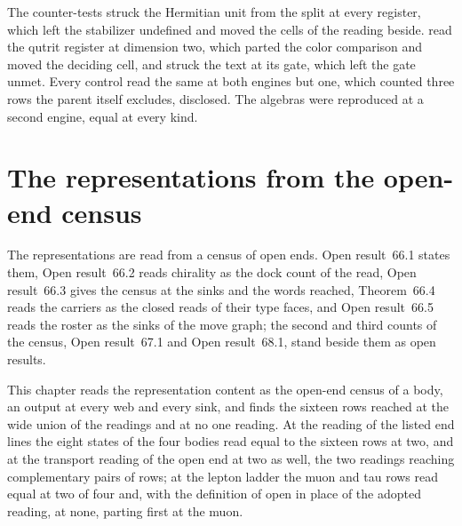 \begin{chproof}
The counter-tests struck the Hermitian unit from the split at every register, which left the stabilizer undefined and moved the cells of the reading beside. read the qutrit register at dimension two, which parted the color comparison and moved the deciding cell, and struck the text at its gate, which left the gate unmet. Every control read the same at both engines but one, which counted three rows the parent itself excludes, disclosed. The algebras were reproduced at a second engine, equal at every kind.
\end{chproof}
\par\medskip{}\label{narr:close:4-2}\par
\section{The representations from the open-end census}\label{mod:IV-3-representations-from-the-open-end-census}
\label{narr:open:4-3}The representations are read from a census of open ends. Open result~66.1 states them, Open result~66.2 reads chirality as the dock count of the read, Open result~66.3 gives the census at the sinks and the words reached, Theorem~66.4 reads the carriers as the closed reads of their type faces, and Open result~66.5 reads the roster as the sinks of the move graph; the second and third counts of the census, Open result~67.1 and Open result~68.1, stand beside them as open results.
\begin{chwall}\label{box:IV-3-representations-from-the-open-end-census:1}
This chapter reads the representation content as the open-end census of a body, an output at every web and every sink, and finds the sixteen rows reached at the wide union of the readings and at no one reading. At the reading of the listed end lines the eight states of the four bodies read equal to the sixteen rows at two, and at the transport reading of the open end at two as well, the two readings reaching complementary pairs of rows; at the lepton ladder the muon and tau rows read equal at two of four and, with the definition of open in place of the adopted reading, at none, parting first at the muon.
\end{chwall}

